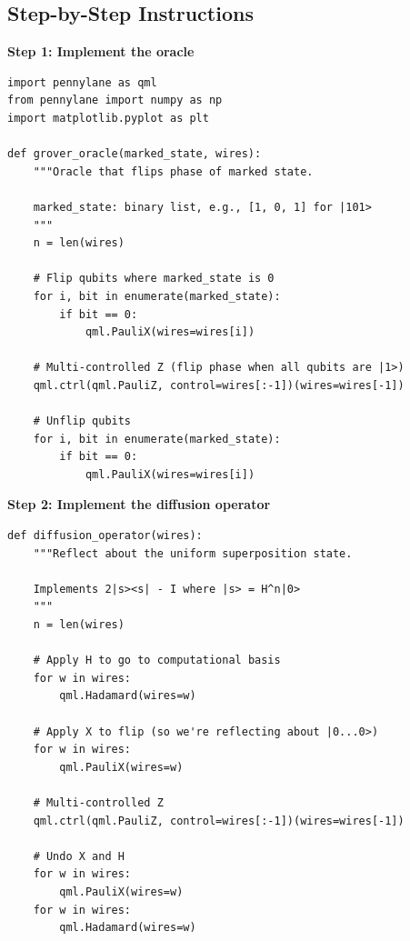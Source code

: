 \documentclass[11pt,a4paper]{article}
\begin{document}
\subsection*{Step-by-Step Instructions}

\textbf{Step 1: Implement the oracle}
\begin{lstlisting}
import pennylane as qml
from pennylane import numpy as np
import matplotlib.pyplot as plt

def grover_oracle(marked_state, wires):
    """Oracle that flips phase of marked state.
    
    marked_state: binary list, e.g., [1, 0, 1] for |101>
    """
    n = len(wires)
    
    # Flip qubits where marked_state is 0
    for i, bit in enumerate(marked_state):
        if bit == 0:
            qml.PauliX(wires=wires[i])
    
    # Multi-controlled Z (flip phase when all qubits are |1>)
    qml.ctrl(qml.PauliZ, control=wires[:-1])(wires=wires[-1])
    
    # Unflip qubits
    for i, bit in enumerate(marked_state):
        if bit == 0:
            qml.PauliX(wires=wires[i])
\end{lstlisting}

\textbf{Step 2: Implement the diffusion operator}
\begin{lstlisting}
def diffusion_operator(wires):
    """Reflect about the uniform superposition state.
    
    Implements 2|s><s| - I where |s> = H^n|0>
    """
    n = len(wires)
    
    # Apply H to go to computational basis
    for w in wires:
        qml.Hadamard(wires=w)
    
    # Apply X to flip (so we're reflecting about |0...0>)
    for w in wires:
        qml.PauliX(wires=w)
    
    # Multi-controlled Z
    qml.ctrl(qml.PauliZ, control=wires[:-1])(wires=wires[-1])
    
    # Undo X and H
    for w in wires:
        qml.PauliX(wires=w)
    for w in wires:
        qml.Hadamard(wires=w)
\end{lstlisting}
\end{document}
